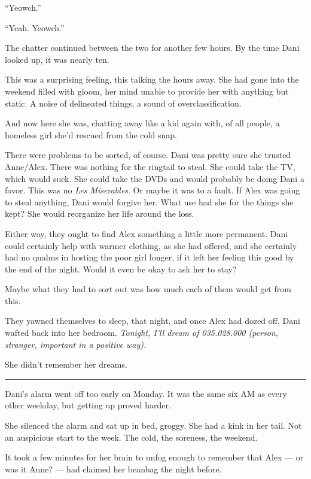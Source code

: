 ``Yeowch.''

``Yeah. Yeowch.''

The chatter continued between the two for another few hours. By the time Dani looked up, it was nearly ten.

This was a surprising feeling, this talking the hours away. She had gone into the weekend filled with gloom, her mind unable to provide her with anything but static. A noise of delineated things, a sound of overclassification.

And now here she was, chatting away like a kid again with, of all people, a homeless girl she'd rescued from the cold snap.

There were problems to be sorted, of course. Dani was pretty sure she trusted Anne/Alex. There was nothing for the ringtail to steal. She could take the TV, which would suck. She could take the DVDs and would probably be doing Dani a favor. This was no \emph{Les Miserables}. Or maybe it was to a fault. If Alex was going to steal anything, Dani would forgive her. What use had she for the things she kept? She would reorganize her life around the loss.

Either way, they ought to find Alex something a little more permanent. Dani could certainly help with warmer clothing, as she had offered, and she certainly had no qualms in hosting the poor girl longer, if it left her feeling this good by the end of the night. Would it even be okay to ask her to stay?

Maybe what they had to sort out was how much each of them would get from this.

They yawned themselves to sleep, that night, and once Alex had dozed off, Dani wafted back into her bedroom. \emph{Tonight, I'll dream of 035.028.000 (person, stranger, important in a positive way).}

She didn't remember her dreams.

\begin{center}\rule{0.5\linewidth}{\linethickness}\end{center}

Dani's alarm went off too early on Monday. It was the same six AM as every other weekday, but getting up proved harder.

She silenced the alarm and sat up in bed, groggy. She had a kink in her tail. Not an auspicious start to the week. The cold, the soreness, the weekend.

It took a few minutes for her brain to unfog enough to remember that Alex --- or was it Anne? --- had claimed her beanbag the night before.

